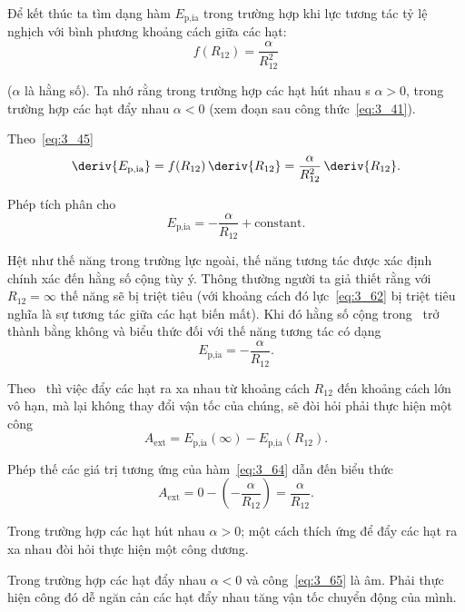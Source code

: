 Để kết thúc ta tìm dạng hàm $E_{\text{p,ia}}$ trong trường hợp khi lực tương tác tỷ lệ nghịch với bình phương khoảng cách giữa các hạt: 
\begin{equation}\label{eq:3_62}
f(R_{12}) = \frac{\alpha}{R_{12}^2}
\end{equation}

\noindent
($\alpha$ là hằng số). Ta nhớ rằng trong trường hợp các hạt hút nhau s $\alpha>0$, trong trường hợp các hạt đẩy nhau $\alpha<0$ (xem đoạn sau công thức~\eqref{eq:3_41}).

Theo~\eqref{eq:3_45}
\begin{equation*}
\deriv{E_{\text{p,ia}}} = f(R_{12})\,\deriv{R_{12}} = \frac{\alpha}{R_{12}^2}\,\deriv{R_{12}}.
\end{equation*}

\noindent
Phép tích phân cho 
\begin{equation}\label{eq:3_63}
E_{\text{p,ia}} = - \frac{\alpha}{R_{12}} + \text{constant}.
\end{equation}

Hệt như thế năng trong trường lực ngoài, thế năng tương tác được xác định chính xác đến hằng số cộng tùy ý. Thông thường người ta giả thiết rằng với $R_{12}=\infty$ thế năng sẽ bị triệt tiêu (với khoảng cách đó lực~\eqref{eq:3_62} bị triệt tiêu nghĩa là sự tương tác giữa các hạt biến mất). Khi đó hằng số cộng trong~ trở thành bằng không và biểu thức đối với thế năng tương tác có dạng 
\begin{equation}\label{eq:3_64}
E_{\text{p,ia}} = - \frac{\alpha}{R_{12}}.
\end{equation}

Theo~ thì việc đẩy các hạt ra xa nhau từ khoảng cách $R_{12}$ đến khoảng cách lớn vô hạn, mà lại không thay đổi vận tốc của chúng, sẽ đòi hỏi phải thực hiện một công
\begin{equation*}
A_{\text{ext}} = E_{\text{p,ia}}(\infty) - E_{\text{p,ia}}(R_{12}).
\end{equation*}

\noindent
Phép thế các giá trị tương ứng của hàm~\eqref{eq:3_64} dẫn đến biểu thức
\begin{equation}\label{eq:3_65}
A_{\text{ext}} = 0 - \left(-\frac{\alpha}{R_{12}}\right) = \frac{\alpha}{R_{12}}.
\end{equation}

Trong trường hợp các hạt hút nhau $\alpha>0$; một cách thích ứng để đẩy các hạt ra xa nhau đòi hỏi thực hiện một công dương.

Trong trường hợp các hạt đẩy nhau $\alpha<0$ và công~\eqref{eq:3_65} là âm. Phải thực hiện công đó dễ ngăn cản các hạt đẩy nhau tăng vận tốc chuyển động của mình.

